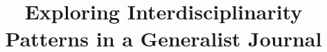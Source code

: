 %
%
%
%
%
%
\RequirePackage{fix-cm}
%
\documentclass[smallextended]{svjour3}       %
%
\smartqed  %
%
\usepackage{graphicx}
%
%
%
%
%




\usepackage{natbib}








\title{Exploring Interdisciplinarity Patterns in a Generalist Journal
}

